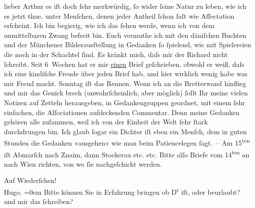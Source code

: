 \pstart{}lieber Arthur\pend\vspace{0.5em}
\pstart
           es iſt doch{ }ſehr merkwürdig,{ }ſo wider{ }ſeine Natur zu leben, wie ich es jetzt thue,
               unter Menſchen, denen jeder Antheil{ }ſchon faſt wie Affectation erſcheint. Ich bin
               begierig, wie ich das{ }ſehen werde, wenn ich von dem unmittelbaren Zwang befreit bin.
               Euch vermuthe ich mit den däniſchen Buchten und
               der Münchener Bilderausſtellung in {\pb}Gedanken{ }ſo{ }ſpielend, wie mit
               Spielereien die noch in der Schachtel{ }ſind. Es kränkt mich, daſs mir der Richard nicht{ }ſchreibt. Seit 6 Wochen hat er
               mir \uline{einen} Brief geſchrieben, obwohl er weiß, daſs ich
               eine kindiſche Freude über jeden Brief hab, und hier wirklich wenig habe was mir
               Freud macht. Sonntag iſt das Rennen. Wenn ich an die Bretterwand hinflieg und mir das
               Genick brech (unwahrſcheinlich, {\pb}aber möglich){ }ſollt Ihr meine vielen Notizen auf Zetteln herausgeben, in
               Gedankengruppen geordnet, mit einem{ }ſehr einfachen, die Aſſociationen aufdeckenden
               Commentar. Denn meine Gedanken gehören alle zuſammen, weil ich von der Einheit der
               Welt{ }ſehr{ }ſtark durchdrungen bin. Ich glaub{ }ſogar ein Dichter iſt eben ein Menſch,
               dem in guten Stunden die Gedanken »ausgehen« wie man beim Patiencelegen{ }ſagt. – Am
                     15\textsuperscript{ten} iſt Abmarſch {\pb}nach Znaim, dann Stockerau etc. etc. Bitte alſo Briefe vom 14\textsuperscript{ten} an nach Wien richten, von wo{ }ſie
               nachgeſchickt werden.\pend
           
\pstart
           Auf Wiederſehen!{\\[\baselineskip]}\spacefill\mbox{Hugo.}\pend
           \leftskip=0em{}
\pstart
           \noindent{}Bitte können Sie in Erfahrung bringen ob D\textsuperscript{r}{ }\label{K_L00471-1v}\label{K_L00471-1} iſt, oder beurlaubt? und mir das{ }ſchreiben?\pend
           \endnumbering{}  \newcommand{\dateiname}{L00471}\newcommand{\titel}{Hugo von Hofmannsthal an Arthur Schnitzler, 9. 8. [1895]}\newcommand{\editorInnen}{Martin Anton Müller und Gerd-Hermann Susen}
